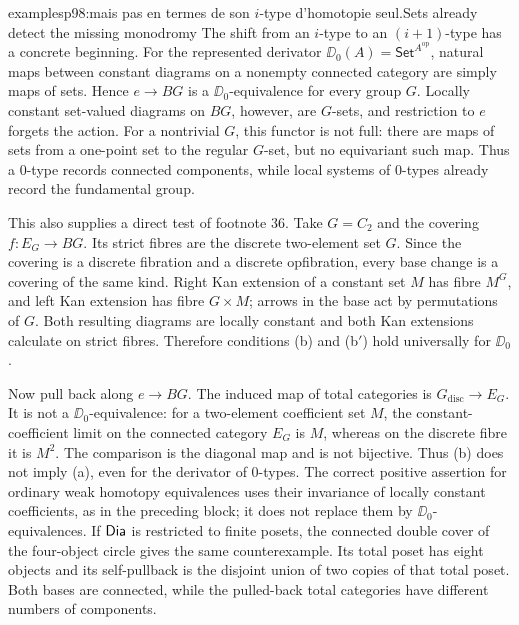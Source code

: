 \begin{dcomment}{examples}{p98:mais pas en termes de son $i$-type d’homotopie seul.}{Sets already detect the missing monodromy}
The shift from an $i$-type to an $(i+1)$-type has a concrete beginning. For the represented derivator
$\DD_0(A)=\mathsf{Set}^{A^{\mathrm{op}}}$, natural maps between constant diagrams on a nonempty connected category are simply maps of sets. Hence $e\to BG$ is a $\DD_0$-equivalence for every group $G$. Locally constant set-valued diagrams on $BG$, however, are $G$-sets, and restriction to $e$ forgets the action. For a nontrivial $G$, this functor is not full: there are maps of sets from a one-point set to the regular $G$-set, but no equivariant such map. Thus a $0$-type records connected components, while local systems of $0$-types already record the fundamental group.

This also supplies a direct test of footnote 36. Take $G=C_2$ and the covering $f:E_G\to BG$. Its strict fibres are the discrete two-element set $G$. Since the covering is a discrete fibration and a discrete opfibration, every base change is a covering of the same kind. Right Kan extension of a constant set $M$ has fibre $M^G$, and left Kan extension has fibre $G\times M$; arrows in the base act by permutations of $G$. Both resulting diagrams are locally constant and both Kan extensions calculate on strict fibres. Therefore conditions (b) and (b$'$) hold universally for $\DD_0$.

Now pull back along $e\to BG$. The induced map of total categories is $G_{\mathrm{disc}}\to E_G$. It is not a $\DD_0$-equivalence: for a two-element coefficient set $M$, the constant-coefficient limit on the connected category $E_G$ is $M$, whereas on the discrete fibre it is $M^2$. The comparison is the diagonal map and is not bijective. Thus (b) does not imply (a), even for the derivator of $0$-types. The correct positive assertion for ordinary weak homotopy equivalences uses their invariance of locally constant coefficients, as in the preceding block; it does not replace them by $\DD_0$-equivalences. If $\mathsf{Dia}$ is restricted to finite posets, the connected double cover of the four-object circle gives the same counterexample. Its total poset has eight objects and its self-pullback is the disjoint union of two copies of that total poset. Both bases are connected, while the pulled-back total categories have different numbers of components.
\end{dcomment}


